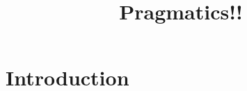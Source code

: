 \documentclass[man,noapacite]{apa2}
\title{Pragmatics!!}
\begin{document}
\maketitle                            


\section{Introduction}


\newpage



\end{document}
